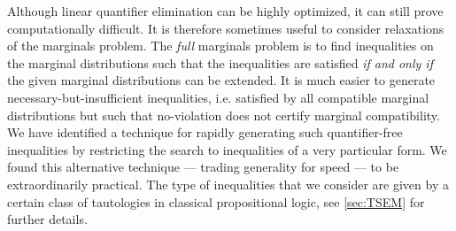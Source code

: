 Although linear quantifier elimination can be highly optimized, it can still prove computationally difficult. It is therefore sometimes useful to consider relaxations of the marginals problem. The \emph{full} marginals problem is to find inequalities on the marginal distributions such that the inequalities are satisfied \emph{if and only if} the given marginal distributions can be extended. It is much easier to generate necessary-but-insufficient inequalities, i.e. satisfied by all compatible marginal distributions but such that no-violation does not certify marginal compatibility. We have identified a technique for rapidly generating such quantifier-free inequalities by restricting the search to inequalities of a very particular form. We found this alternative technique — trading generality for speed — to be extraordinarily practical. The type of inequalities that we consider are given by a certain class of tautologies in classical propositional logic, see \cref{sec:TSEM} for further details.







